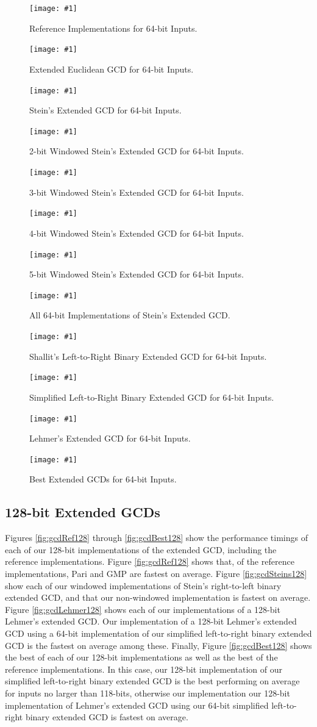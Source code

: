\documentclass{ucalgthes1}
\theoremstyle{definition}
\newcommand{\mygraph}[3]{
	\begin{figure}[htb]
	\centering
	\texttt{[image: \#1]}
	\caption{#3}
	\label{#2}
	\end{figure}
}
\begin{document}
\mygraph{reference-impl-64}{fig:gcdRef64}{Reference Implementations for 64-bit Inputs.}
\mygraph{divrem-64}{fig:gcdDivrem64}{Extended Euclidean GCD for 64-bit Inputs.}
\mygraph{stein1-64}{fig:gcdStein1-64}{Stein's Extended GCD for 64-bit Inputs.}
\mygraph{stein2-64}{fig:gcdStein2-64}{2-bit Windowed Stein's Extended GCD for 64-bit Inputs.}
\mygraph{stein3-64}{fig:gcdStein3-64}{3-bit Windowed Stein's Extended GCD for 64-bit Inputs.}
\mygraph{stein4-64}{fig:gcdStein4-64}{4-bit Windowed Stein's Extended GCD for 64-bit Inputs.}
\mygraph{stein5-64}{fig:gcdStein5-64}{5-bit Windowed Stein's Extended GCD for 64-bit Inputs.}
\mygraph{steins-64}{fig:gcdSteins64}{All 64-bit Implementations of Stein's Extended GCD.}
\mygraph{shallit-64}{fig:gcdShallit64}{Shallit's Left-to-Right Binary Extended GCD for 64-bit Inputs.}
\mygraph{binary_l2r-64}{fig:gcdL2R64}{Simplified Left-to-Right Binary Extended GCD for 64-bit Inputs.}
\mygraph{lehmer-64}{fig:gcdLehmer64}{Lehmer's Extended GCD for 64-bit Inputs.}
\mygraph{best-64}{fig:gcdBest64}{Best Extended GCDs for 64-bit Inputs.}

\clearpage

\subsection{128-bit Extended GCDs}

Figures \ref{fig:gcdRef128} through \ref{fig:gcdBest128} show the performance timings of each of our 128-bit implementations of the extended GCD, including the reference implementations.  Figure \ref{fig:gcdRef128} shows that, of the reference implementations, Pari and GMP are fastest on average.  Figure \ref{fig:gcdSteins128} show each of our windowed implementations of Stein's right-to-left binary extended GCD, and that our non-windowed implementation is fastest on average.  Figure \ref{fig:gcdLehmer128} shows each of our implementations of a 128-bit Lehmer's extended GCD.  Our implementation of a 128-bit Lehmer's extended GCD using a 64-bit implementation of our simplified left-to-right binary extended GCD is the fastest on average among these.  Finally, Figure \ref{fig:gcdBest128} shows the best of each of our 128-bit implementations as well as the best of the reference implementations.  In this case, our 128-bit implementation of our simplified left-to-right binary extended GCD is the best performing on average for inputs no larger than 118-bits, otherwise our implementation our 128-bit implementation of Lehmer's extended GCD using our 64-bit simplified left-to-right binary extended GCD is fastest on average.
\end{document}
